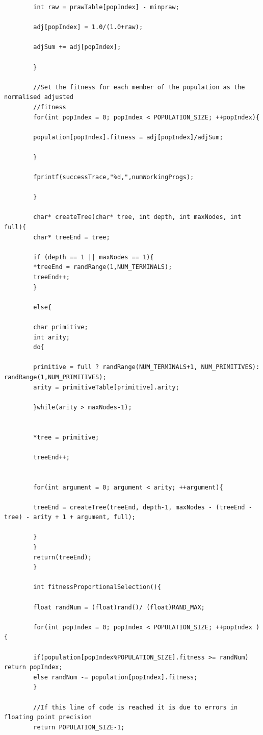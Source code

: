 \documentclass{article}
\begin{document}
\begin{lstlisting}
	    int raw = prawTable[popIndex] - minpraw;
	    
	    adj[popIndex] = 1.0/(1.0+raw);
	    
	    adjSum += adj[popIndex];
	    
	    }
	    
	    //Set the fitness for each member of the population as the normalised adjusted
	    //fitness
	    for(int popIndex = 0; popIndex < POPULATION_SIZE; ++popIndex){
	    
	    population[popIndex].fitness = adj[popIndex]/adjSum;
	    
	    }
	    
	    fprintf(successTrace,"%d,",numWorkingProgs);
	    
	    }
	    
	    char* createTree(char* tree, int depth, int maxNodes, int full){  
	    char* treeEnd = tree;
	    
	    if (depth == 1 || maxNodes == 1){
	    *treeEnd = randRange(1,NUM_TERMINALS);
	    treeEnd++;
	    }
	    
	    else{
	    
	    char primitive;
	    int arity;
	    do{
	    
	    primitive = full ? randRange(NUM_TERMINALS+1, NUM_PRIMITIVES): randRange(1,NUM_PRIMITIVES);
	    arity = primitiveTable[primitive].arity;
	    
	    }while(arity > maxNodes-1);
	    
	    
	    *tree = primitive;
	    
	    treeEnd++;
	    
	    
	    for(int argument = 0; argument < arity; ++argument){
	    
	    treeEnd = createTree(treeEnd, depth-1, maxNodes - (treeEnd - tree) - arity + 1 + argument, full);
	    
	    }
	    }
	    return(treeEnd);
	    }
	    
	    int fitnessProportionalSelection(){
	    
	    float randNum = (float)rand()/ (float)RAND_MAX;
	    
	    for(int popIndex = 0; popIndex < POPULATION_SIZE; ++popIndex ){
	    
	    if(population[popIndex%POPULATION_SIZE].fitness >= randNum) return popIndex;
	    else randNum -= population[popIndex].fitness;
	    }
	    
	    //If this line of code is reached it is due to errors in floating point precision
	    return POPULATION_SIZE-1;
	    

\end{lstlisting}
\end{document}
